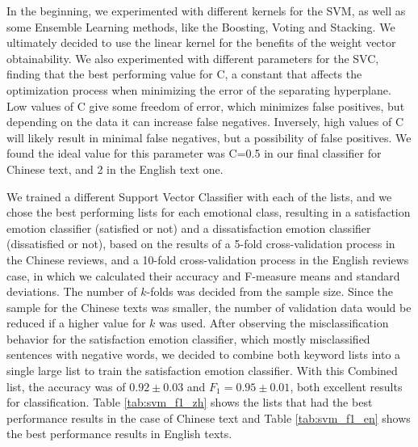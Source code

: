 \documentclass[review]{elsarticle}
\begin{document}
In the beginning, we experimented with different kernels for the SVM, as well as some Ensemble Learning methods, like the Boosting, Voting and Stacking. We ultimately decided to use the linear kernel for the benefits of the weight vector obtainability. We also experimented with different parameters for the SVC, finding that the best performing value for C, a constant that affects the optimization process when minimizing the error of the separating hyperplane. Low values of C give some freedom of error, which minimizes false positives, but depending on the data it can increase false negatives. Inversely, high values of C will likely result in minimal false negatives, but a possibility of false positives. We found the ideal value for this parameter was C=0.5 in our final classifier for Chinese text, and 2 in the English text one.

We trained a different Support Vector Classifier with each of the lists, and we chose the best performing lists for each emotional class, resulting in a satisfaction emotion classifier (satisfied or not) and a dissatisfaction emotion classifier (dissatisfied or not), based on the results of a 5-fold cross-validation process in the Chinese reviews, and a 10-fold cross-validation process in the English reviews case, in which we calculated their accuracy and F-measure means and standard deviations. The number of \(k\)-folds was decided from the sample size. Since the sample for the Chinese texts was smaller, the number of validation data would be reduced if a higher value for \(k\) was used. After observing the misclassification behavior for the satisfaction emotion classifier, which mostly misclassified sentences with negative words, we decided to combine both keyword lists into a single large list to train the satisfaction emotion classifier. With this Combined list, the accuracy was of \(0.92 \pm 0.03\) and \(F_1 = 0.95 \pm 0.01\), both excellent results for classification. Table \ref{tab:svm_f1_zh} shows the lists that had the best performance results in the case of Chinese text and Table \ref{tab:svm_f1_en} shows the best performance results in English texts.
\end{document}
